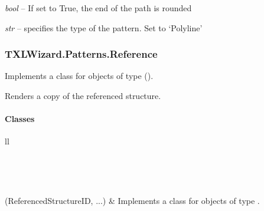 \documentclass[letterpaper,10pt,english]{sphinxmanual}
\begin{document}
\begin{fulllineitems}
\begin{fulllineitems}
\end{fulllineitems}


\begin{fulllineitems}
\label{Chapters/PythonModuleReference/Patterns/TXLWizard.Patterns.Polyline:TXLWizard.Patterns.Polyline.Polyline.RoundCaps}
\emph{bool} -- If set to True, the end of the path is rounded

\end{fulllineitems}


\begin{fulllineitems}
\label{Chapters/PythonModuleReference/Patterns/TXLWizard.Patterns.Polyline:TXLWizard.Patterns.Polyline.Polyline.Type}
\emph{str} -- specifies the type of the pattern. Set to `Polyline'

\end{fulllineitems}


\end{fulllineitems}



\subsubsection{TXLWizard.Patterns.Reference}
\label{Chapters/PythonModuleReference/Patterns/TXLWizard.Patterns.Reference:txlwizard-patterns-reference}\label{Chapters/PythonModuleReference/Patterns/TXLWizard.Patterns.Reference:module-TXLWizard.Patterns.Reference}\label{Chapters/PythonModuleReference/Patterns/TXLWizard.Patterns.Reference::doc}
Implements a class for  objects of type  ().

Renders a copy of the referenced structure.


\paragraph{Classes}
\label{Chapters/PythonModuleReference/Patterns/TXLWizard.Patterns.Reference:classes}
\begin{longtable}{ll}
\hline
\endfirsthead

%
{{}} \\
\hline
\endhead

\hline {} \\ \hline
\endfoot

\endlastfoot


{\hyperref[Chapters/PythonModuleReference/Patterns/TXLWizard.Patterns.Reference:TXLWizard.Patterns.Reference.Reference]{}}(ReferencedStructureID, ...)
 & 
Implements a class for  objects of type .
\\
\hline\end{longtable}
\end{document}
